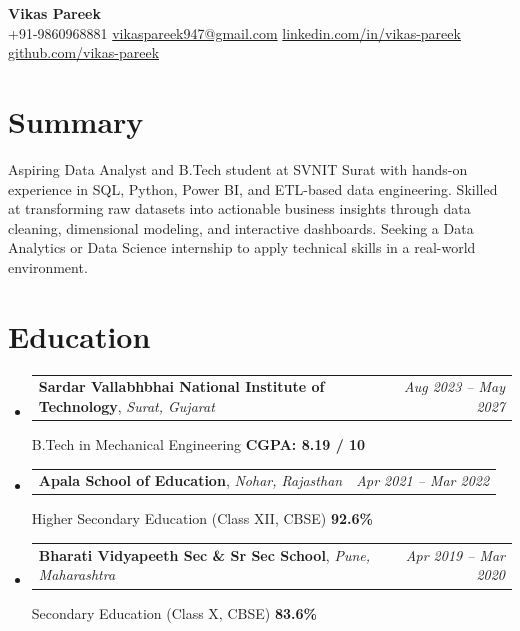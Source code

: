 \documentclass[10pt,letterpaper]{article}
\makeatletter
\newcommand{\entryHeader}[3]{%
  \noindent
  \begin{tabularx}{\linewidth}{@{}X r@{}}
    \textbf{#1}, \textit{#2} & \small\textit{#3}
  \end{tabularx}%
  \vspace{1pt}%
}
\makeatother
\begin{document}

\begin{center}
  {\LARGE\bfseries Vikas Pareek}\\[5pt]
  \small
  +91-9860968881 \quad\textbar\quad
  \href{mailto:vikaspareek947@gmail.com}{vikaspareek947@gmail.com} \quad\textbar\quad
  \href{https://linkedin.com/in/vikas-pareek}{linkedin.com/in/vikas-pareek} \quad\textbar\quad
  \href{https://github.com/vikas-pareek}{github.com/vikas-pareek}
\end{center}

\vspace{2pt}

\section{Summary}

Aspiring Data Analyst and B.Tech student at SVNIT Surat with hands-on experience
in SQL, Python, Power BI, and ETL-based data engineering. Skilled at transforming
raw datasets into actionable business insights through data cleaning, dimensional
modeling, and interactive dashboards. Seeking a Data Analytics or Data Science
internship to apply technical skills in a real-world environment.

\section{Education}

\begin{itemize}[leftmargin=0pt, label={}]

  \item \entryHeader{Sardar Vallabhbhai National Institute of Technology}{Surat, Gujarat}{Aug 2023 -- May 2027}
  B.Tech in Mechanical Engineering \hfill \textbf{CGPA: 8.19 / 10}

  \item \entryHeader{Apala School of Education}{Nohar, Rajasthan}{Apr 2021 -- Mar 2022}
  Higher Secondary Education (Class XII, CBSE) \hfill \textbf{92.6\%}

  \item \entryHeader{Bharati Vidyapeeth Sec \& Sr Sec School}{Pune, Maharashtra}{Apr 2019 -- Mar 2020}
  Secondary Education (Class X, CBSE) \hfill \textbf{83.6\%}

\end{itemize}
\end{document}
